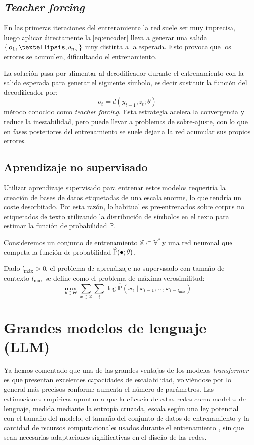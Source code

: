\subsection{\textit{Teacher forcing}}
En las primeras iteraciones del entrenamiento la red suele ser muy imprecisa, luego aplicar directamente la \cref{eq:encoder} lleva a generar una salida \( \Set{ o_{1}, …, o_{n_o} } \) muy distinta a la esperada. Esto provoca que los errores se acumulen, dificultando el entrenamiento. 

La solución pasa por alimentar al decodificador durante el entrenamiento con la salida esperada para generar el siguiente símbolo, es decir sustituir la función del decodificador por:
\[
    o_{t} = d(y_{t-1}, z_{t}; \theta)
\]
método conocido como \textit{teacher forcing}. Esta estrategia acelera la convergencia y reduce la inestabilidad, pero puede llevar a problemas de sobre-ajuste, con lo que en fases posteriores del entrenamiento se suele dejar a la red acumular sus propios errores.

\subsection{Aprendizaje no supervisado}
Utilizar aprendizaje supervisado para entrenar estos modelos requeriría la creación de bases de datos etiquetadas de una escala enorme, lo que tendría un coste desorbitado. Por esta razón, lo habitual es pre-entrenarlos sobre corpus no etiquetados de texto utilizando la distribución de símbolos en el texto para estimar la función de probabilidad \( \mathbb{P} \). 

\begin{definition}
    Consideremos un conjunto de entrenamiento \( \mathbb{X} \subset \mathbb{V}^* \) y una red neuronal que computa la función de probabilidad \( \widehat{\mathbb{P}}(\smallbullet; \theta) \). 
    
    Dado \( l_\text{máx} > 0 \), el problema de aprendizaje no supervisado con tamaño de contexto \( l_\text{máx} \) se define como el problema de máxima verosimilitud:
    \[
        \max_{\theta \in \Theta} \sum_{x \in \mathbb{X}} \sum_i \log \widehat{\mathbb{P}} \left(x_{i} \mid x_{i-1}, …, x_{i-l_\text{máx}} \right)
    \]
\end{definition}

\section{Grandes modelos de lenguaje (LLM)}
Ya hemos comentado que una de las grandes ventajas de los modelos \textit{transformer} es que presentan excelentes capacidades de escalabilidad, volviéndose por lo general más precisos conforme aumenta el número de parámetros. Las estimaciones empíricas apuntan a que la eficacia de estas redes como modelos de lenguaje, medida mediante la entropía cruzada, escala según una ley potencial con el tamaño del modelo, el tamaño del conjunto de datos de entrenamiento y la cantidad de recursos computacionales usados durante el entrenamiento \cite{kaplan2020scaling}, sin que sean necesarias adaptaciones significativas en el diseño de las redes.

